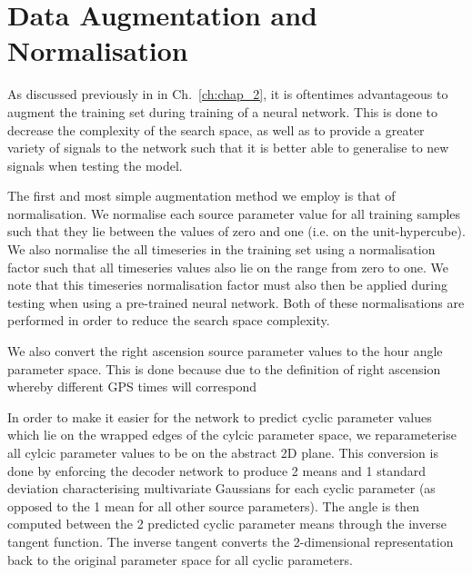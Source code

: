\section{Data Augmentation and Normalisation}\label{sec:vit_data_aug}

As discussed previously in in Ch.~\ref{ch:chap_2}, it is 
oftentimes advantageous to augment the training set during training 
of a neural network. This is done to decrease the complexity of 
the search space, as well as to provide a greater variety of 
signals to the network such that it is better able to generalise 
to new signals when testing the model. 

%
%
The first and most simple augmentation method we employ is that of
normalisation. 
We normalise each source parameter value for all training samples such that 
they lie between the values of zero and one (i.e. on the unit-hypercube). We also normalise the 
all timeseries in the training set using a normalisation factor such that all  
timeseries values also lie on the 
range from zero to one. We note that this timeseries normalisation factor 
must also then be applied during testing when using a pre-trained neural network. 
Both of these normalisations are performed in order to reduce the search 
space complexity. 

%
%
We also convert the right ascension source parameter values to 
the hour angle parameter space. This is done because due to the 
definition of right ascension whereby different \ac{GPS} times 
will correspond~

%
%
In order to make it easier for the network to predict cyclic parameter 
values which lie on the wrapped edges of the cylcic parameter space, we 
reparameterise all cylcic parameter values to be on the abstract 
2D plane. This conversion is done by enforcing the decoder network to 
produce 2 means and 1 standard deviation characterising multivariate 
Gaussians for each cyclic parameter (as 
opposed to the 1 mean for all other source parameters). The angle 
is then computed between the 2 predicted cyclic parameter means 
through the inverse tangent function. The inverse tangent converts the 
2-dimensional representation back to the original 
parameter space for all cyclic parameters. 

